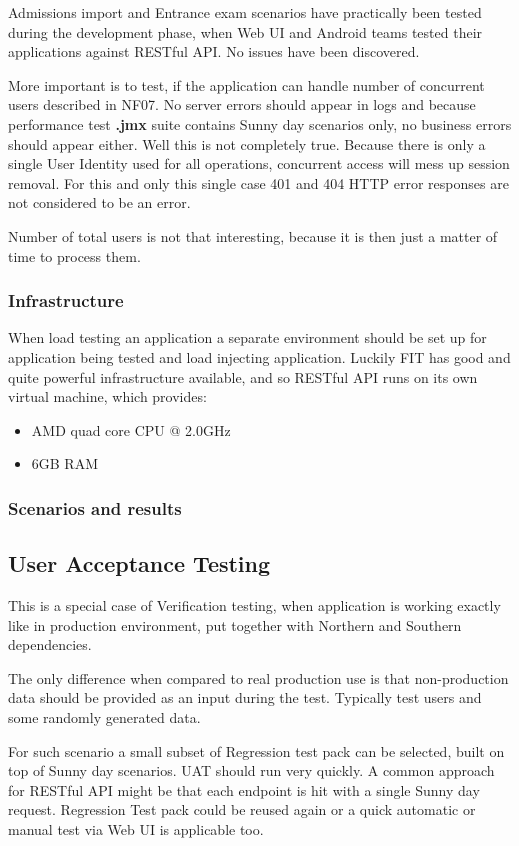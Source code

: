 	Admissions import and Entrance exam scenarios have practically been tested during the development phase, when Web UI
	and Android teams tested their applications against RESTful API. No issues have been discovered.
	
	More important is to test, if the application can handle number of concurrent users described in NF07. No server errors
	should appear in logs and because performance test \textbf{.jmx} suite contains Sunny day scenarios only, no business
	errors should appear either. Well this is not completely true. Because there is only a single User Identity used for
	all operations, concurrent access will mess up session removal. For this and only this single case 401 and 404 HTTP
	error responses are not considered to be an error.
	
	Number of total users is not that interesting, because it is then just a matter of time to process them.
	
	\subsubsection{Infrastructure}
	
	When load testing an application a separate environment should be set up for application being tested and load
	injecting application. Luckily \gls{FIT} has good and quite powerful infrastructure available, and so RESTful API runs
	on its own virtual machine, which provides:
	
	\begin{itemize}
		\item AMD quad core CPU @ 2.0GHz
		\item 6GB RAM
	\end{itemize}
	
	\subsubsection{Scenarios and results}
	
	
	\subsection{User Acceptance Testing}
	
	This is a special case of Verification testing, when application is working exactly like in production environment, put
	together with Northern and Southern dependencies.
	
	The only difference when compared to real production use is that non-production data should be provided as an input
	during the test. Typically test users and some randomly generated data.
	
	For such scenario a small subset of Regression test pack can be selected, built on top of Sunny day scenarios.
	UAT should run very quickly. A common approach for RESTful API might be that each endpoint is hit with a single Sunny
	day request. Regression Test pack could be reused again or a quick automatic or manual test via Web UI is applicable
	too.
